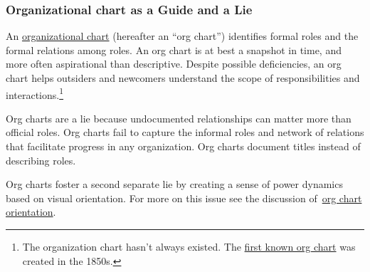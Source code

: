\subsubsection*{Organizational chart as a Guide and a Lie\label{sec:org-chart-as-guide-and-lie}}

An \href{https://en.wikipedia.org/wiki/Organizational_chart}{organizational chart} 
\iftoggle{WPinmargin}{\marginpar{[Wikipedia] Organizational\\chart}}{}
(hereafter an ``\gls{org chart}'') identifies formal roles and the formal relations among roles. An org chart is at best a snapshot in time, and more often aspirational than descriptive. Despite possible deficiencies, an org chart helps outsiders and newcomers understand the scope of responsibilities and interactions.\footnote{The organization chart hasn't always existed. The \href{https://en.wikipedia.org/wiki/George_Holt_Henshaw\#First_organization_chart}{first known org chart} 
was created in the 1850s.}

Org charts are a lie because undocumented relationships can matter more than official roles. Org charts fail to capture the informal roles and network of relations that facilitate progress in any organization. Org charts document titles instead of describing roles.

Org charts foster a second separate lie by creating a sense of power dynamics based on visual orientation. For more on this issue see the discussion of~\hyperref[sec:org-chart-orientation]{org chart orientation}\iftoggle{haspagenumbers}{ on page~\pageref{sec:org-chart-orientation}}{}.
